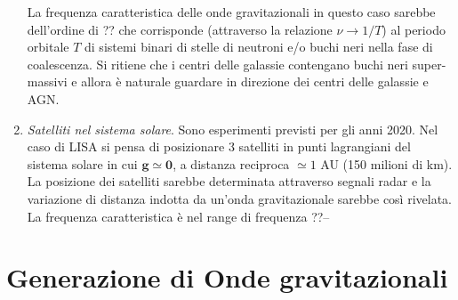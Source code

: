\begin{enumerate}
  La frequenza caratteristica delle onde gravitazionali in questo caso sarebbe
  dell'ordine di ?? che corrisponde (attraverso la relazione $\nu \to 1/T$) al
  periodo orbitale $T$ di sistemi binari di stelle di neutroni e/o buchi neri
  nella fase di coalescenza.  Si ritiene che i centri delle galassie contengano
  buchi neri super-massivi e allora è naturale guardare in direzione dei centri
  delle galassie e AGN.
\item \emph{Satelliti nel sistema solare}.  Sono esperimenti previsti per gli
  anni 2020.  Nel caso di LISA si pensa di posizionare 3 satelliti in punti
  lagrangiani del sistema solare in cui $\bm{g} \simeq \bm{0}$, a distanza
  reciproca $\simeq 1$ AU (150 milioni di km).  La posizione dei satelliti
  sarebbe determinata attraverso segnali radar e la variazione di distanza
  indotta da un'onda gravitazionale sarebbe così rivelata.  La frequenza
  caratteristica è nel range di frequenza ??--
\end{enumerate}

\section{Generazione di Onde gravitazionali}
\label{sec:onde-grav-masse}

